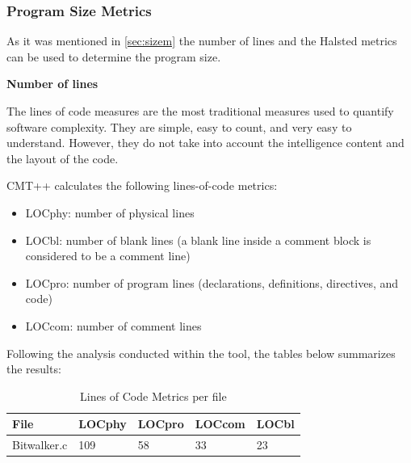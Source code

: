 \subsubsection{Program Size Metrics}
As it was mentioned in \ref{sec:sizem} the number of lines and the Halsted metrics can be used to determine the program size.
\begin{description}
\item \textbf{Number of lines}

The lines of code measures are the most traditional measures used to quantify software complexity. They are simple, easy to count, and very easy to understand. However, they do not take into account the intelligence content and the layout of the code.

CMT++ calculates the following lines-of-code metrics:
\begin{itemize}
\item LOCphy: number of physical lines
\item LOCbl: number of blank lines (a blank line inside a comment block is considered to be a comment line)
\item LOCpro: number of program lines (declarations, definitions, directives, and code)
\item LOCcom: number of comment lines
\end{itemize}

Following the analysis conducted within the tool, the tables below summarizes the results:

\begin{longtable}{||p{}|p{}|p{}|p{}|p{}||}
  \caption{Lines of Code Metrics per file}\\
    \hline\hline
    \textbf{File} &\textbf{LOCphy} & \textbf{LOCpro} & \textbf{LOCcom} & \textbf{LOCbl}\\
    \hline\hline
    \endhead
    \hline\hline
    \endfoot
    Bitwalker.c & 109 & 58 & 33 & 23
    \\
    \hline
   \end{longtable}
   

\end{description}
